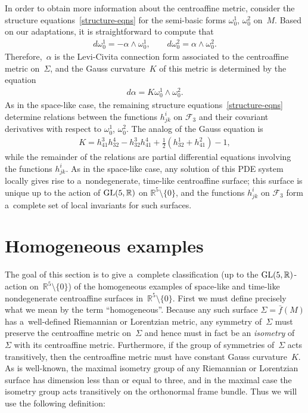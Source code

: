\documentclass[10pt,a4paper]{amsart}
\numberwithin{equation}{section}
\theoremstyle{definition}
\begin{document}
In order to obtain more information about the centroaf\/f\/ine metric, consider the structure
equations~\eqref{structure-eqns} for the semi-basic forms $\omega^1_0$, $\omega^2_0$ on~$M$.
Based on our adaptations, it is straightforward to compute that
\begin{gather*}
d\omega^1_0 = -\alpha \wedge \omega^1_0,
\qquad
d\omega^2_0 = \alpha \wedge \omega^2_0.
\end{gather*}
Therefore,~$\alpha$ is the Levi-Civita connection form associated to the centroaf\/f\/ine metric on~$\Sigma$, and the Gauss
curvature~$K$ of this metric is determined by the equation
\begin{gather*}
d\alpha = K  \omega^1_0 \wedge \omega^2_0.
\end{gather*}
As in the space-like case, the remaining structure equations~\eqref{structure-eqns} determine relations between the
functions $h^i_{jk}$ on $\mathcal{F}_3$ and their covariant derivatives with respect to $\omega^1_0$, $\omega^2_0$.
The analog of the Gauss equation is
\begin{gather}
K = h^3_{41} h^4_{32} - h^3_{32} h^4_{41} + \tfrac{1}{2}\left(h^1_{32} + h^2_{41} \right) - 1,
\label{time-like-Gauss-eqn}
\end{gather}
while the remainder of the relations are partial dif\/ferential equations involving the functions $h^i_{jk}$.
As in the space-like case, any solution of this PDE system locally gives rise to a~nondegenerate, time-like centroaf\/f\/ine
surface; this surface is unique up to the action of ${\rm GL}(5,\mathbb{R})$ on $\mathbb{R}^5 \setminus \{0 \}$, and the
functions $h^i_{jk}$ on $\mathcal{F}_3$ form a~complete set of local invariants for such surfaces.


\section{Homogeneous examples}\label{homog-sec}

The goal of this section is to give a~complete classif\/ication (up to the ${\rm GL}(5,\mathbb{R})$-action on~$\mathbb{R}^5 \setminus\{0\}$) of the homogeneous examples of space-like and time-like nondegenerate centroaf\/f\/ine surfaces
in~$\mathbb{R}^5 \setminus\{0\}$.
First we must def\/ine precisely what we mean by the term ``homogeneous''. Because any such surface $\Sigma = \bar{f}(M)$
has a~well-def\/ined Riemannian or Lorentzian metric, any symmetry of~$\Sigma$ must preserve the centroaf\/f\/ine metric
on~$\Sigma$ and hence must in fact be an {\em isometry} of~$\Sigma$ with its centroaf\/f\/ine metric.
Furthermore, if the group of symmetries of~$\Sigma$ acts transitively, then the centroaf\/f\/ine metric must have constant
Gauss curvature~$K$.
As is well-known, the maximal isometry group of any Riemannian or Lorentzian surface has dimension less than or equal to
three, and in the maximal case the isometry group acts transitively on the orthonormal frame bundle.
Thus we will use the following def\/inition:
\end{document}
